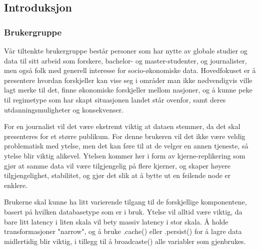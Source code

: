 \subsection{Introduksjon}

\subsubsection{Brukergruppe}
Vår tiltenkte brukergruppe består personer som har nytte av globale studier og data til sitt arbeid som forskere, bachelor- og master-studenter, og journalister, men også folk med generell interesse for socio-økonomiske data. Hovedfokuset er å presentere hvordan forskjeller kan vise seg i områder man ikke nødvendigvis ville lagt merke til det, finne økonomiske forskjeller mellom nasjoner, og å kunne peke til regimetype som har skapt situasjonen landet står ovenfor, samt deres utdanningsmuligheter og konsekvenser.

For en journalist vil det være ekstremt viktig at dataen stemmer, da det skal presenteres for et større publikum. For denne brukeren vil det ikke være veldig problematisk med ytelse, men det kan føre til at de velger en annen tjeneste, så ytelse blir viktig alikevel. Ytelsen kommer her i form av kjerne-replikering som gjør at samme data vil være tilgjengelig på flere kjerner, og skaper høyere tilgjengelighet, stabilitet, og gjør det slik at å bytte ut en feilende node er enklere.

Brukerne skal kunne ha litt varierende tilgang til de forskjellige komponentene, basert på hvilken databasetype som er i bruk. Ytelse vil alltid være viktig, da bare litt latency i liten skala vil bety massiv latency i stor skala. Å holde transformasjoner "narrow", og å bruke .cache() eller .persist() for å lagre data midlertidig blir viktig, i tillegg til å broadcaste() alle variabler som gjenbrukes.




